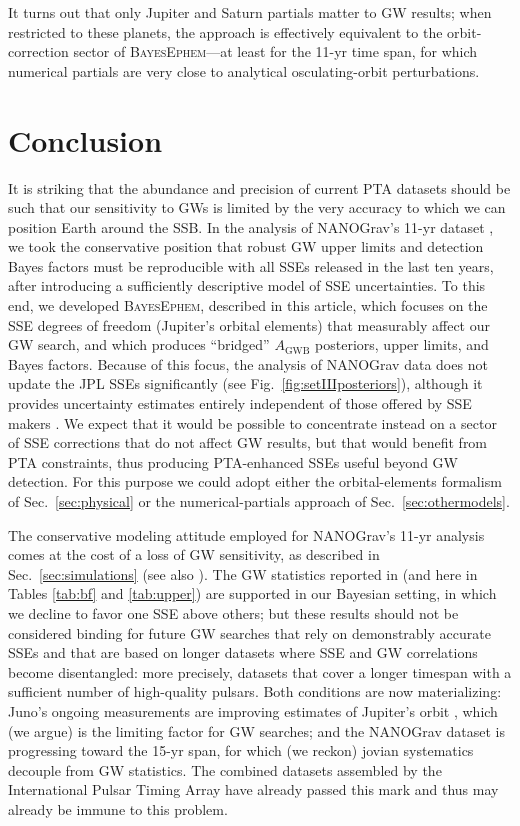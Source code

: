 \documentclass[iop,apj,twocolappendix]{emulateapj}
\begin{document}
\begin{itemize}
    It turns out that only Jupiter and Saturn partials matter to GW results; when restricted to these planets, the approach is effectively equivalent to the orbit-correction sector of \textsc{BayesEphem}---at least for the 11-yr time span, for which numerical partials are very close to analytical osculating-orbit perturbations.
\end{itemize}

\section{Conclusion}
\label{sec:conclusion}

It is striking that the abundance and precision of current PTA datasets should be such that our sensitivity to GWs is limited by the very accuracy to which we can position Earth around the SSB.
In the analysis of NANOGrav's 11-yr dataset \citep{2018ApJ...859...47A}, we took the conservative position that robust GW upper limits and detection Bayes factors must be reproducible with all SSEs released in the last ten years, after introducing a sufficiently descriptive model of SSE uncertainties.
To this end, we developed \textsc{BayesEphem}, described in this article, which focuses on the SSE degrees of freedom (Jupiter's orbital elements) that measurably affect our GW search, and which produces ``bridged'' $A_\mathrm{GWB}$ posteriors, upper limits, and Bayes factors. Because of this focus, the analysis of NANOGrav data does not update the JPL SSEs significantly (see Fig.\ \ref{fig:setIIIposteriors}), although it provides uncertainty estimates entirely independent of those offered by SSE makers \citep{de434,de438}. We expect that it would be possible to concentrate instead on a sector of SSE corrections that do not affect GW results, but that would benefit from PTA constraints, thus producing PTA-enhanced SSEs useful beyond GW detection. For this purpose we could adopt either the orbital-elements formalism of Sec.\ \ref{sec:physical} or the numerical-partials approach of Sec.\ \ref{sec:othermodels}.

The conservative modeling attitude employed for NANOGrav's 11-yr analysis comes at the cost of a loss of GW sensitivity, as described in Sec.\ \ref{sec:simulations} (see also \citealt{2019ApJ...876...55R}). The GW statistics reported in \cite{2018ApJ...859...47A} (and here in Tables \ref{tab:bf} and \ref{tab:upper}) are supported in our Bayesian setting, in which we decline to favor one SSE above others; but these results should not be considered binding for future GW searches that rely on demonstrably accurate SSEs and that are based on longer datasets where SSE and GW correlations become disentangled:
more precisely, datasets that cover a longer timespan with a sufficient number of high-quality pulsars.
Both conditions are now materializing: Juno's ongoing measurements are improving estimates of Jupiter's orbit \citep{de438}, which (we argue) is the limiting factor for GW searches; and the NANOGrav dataset is progressing toward the 15-yr span, for which (we reckon) jovian systematics decouple from GW statistics.
The combined datasets assembled by the International Pulsar Timing Array \citep{2019MNRAS.490.4666P} have already passed this mark and thus may already be immune to this problem.
\end{document}

